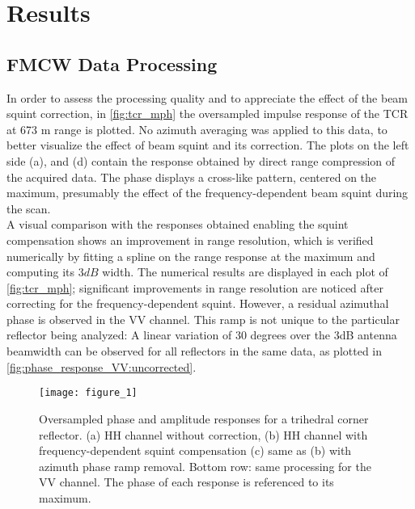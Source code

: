 \section{Results}\label{sec:results}
\subsection{FMCW Data Processing}\label{sec:res_SLC}
In order to assess the processing quality and to appreciate the effect of the beam squint correction, in  \autoref{fig:tcr_mph} the oversampled impulse response of the TCR at 673 m range is plotted. No azimuth averaging was applied to this data, to better visualize the effect of beam squint and its correction. The plots on the left side (a), and (d) contain the response obtained by direct range compression of the acquired data. The phase displays a cross-like pattern, centered on the maximum, presumably the effect of the frequency-dependent beam squint during the scan.\\ A visual comparison with the responses obtained enabling the squint compensation shows an improvement in range resolution, which is verified numerically by fitting a spline on the range response at the maximum and computing its $3 dB$ width. The numerical results are displayed in each plot of \autoref{fig:tcr_mph}; significant improvements in range resolution are noticed after correcting for the frequency-dependent squint. However, a residual azimuthal phase is observed in the VV channel. This ramp is not unique to the particular reflector being analyzed: A linear variation of 30 degrees over the 3dB antenna beamwidth can be observed for all reflectors in the same data, as plotted in \autoref{fig:phase_response_VV:uncorrected}.
\begin{figure*}[ht]
	\centering
	\texttt{[image: figure\_1]}
	\caption{Oversampled phase and amplitude responses for a trihedral corner reflector. (a) HH channel without correction, (b) HH channel with frequency-dependent squint compensation (c) same as (b) with azimuth phase ramp removal. Bottom row: same processing for the VV channel.
	The phase of each response is referenced to its maximum.}
	\label{fig:tcr_mph}
\end{figure*}

